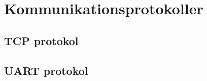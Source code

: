 
\chapter{Kommunikationsprotokoller}
\label{ch:KomProtokol}

\section{TCP protokol}
\label{TCPprotokol}

\section{UART protokol}
